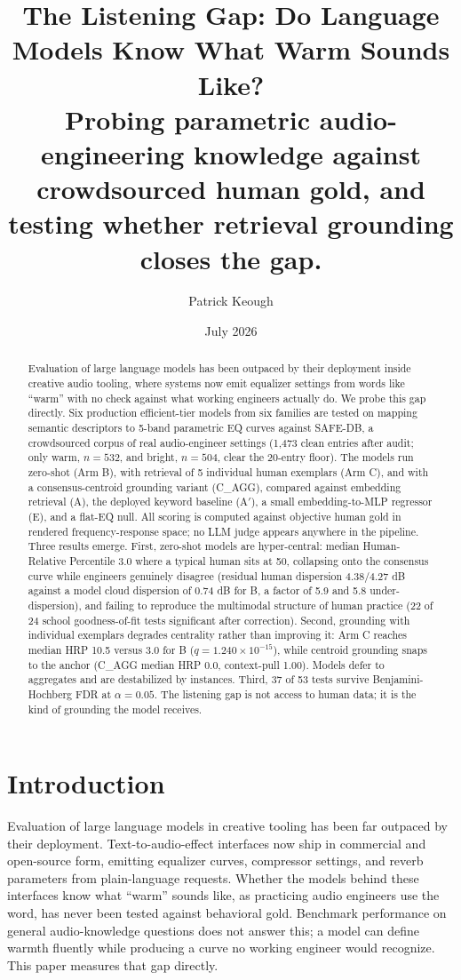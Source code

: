 \documentclass[11pt]{article}
\title{\textbf{The Listening Gap: Do Language Models Know What Warm Sounds Like?} \\[6pt] \large Probing parametric audio-engineering knowledge against crowdsourced human gold, and testing whether retrieval grounding closes the gap.}
\author[1]{Patrick Keough}
\affil[1]{Independent Researcher, \texttt{pskeough@gmail.com}}
\date{July 2026}
\begin{document}
\maketitle

\begin{abstract}
\noindent Evaluation of large language models has been outpaced by their deployment inside creative audio tooling, where systems now emit equalizer settings from words like ``warm'' with no check against what working engineers actually do. We probe this gap directly. Six production efficient-tier models from six families are tested on mapping semantic descriptors to 5-band parametric EQ curves against SAFE-DB, a crowdsourced corpus of real audio-engineer settings (1,473 clean entries after audit; only warm, $n=532$, and bright, $n=504$, clear the 20-entry floor). The models run zero-shot (Arm B), with retrieval of 5 individual human exemplars (Arm C), and with a consensus-centroid grounding variant (C\_AGG), compared against embedding retrieval (A), the deployed keyword baseline (A$'$), a small embedding-to-MLP regressor (E), and a flat-EQ null. All scoring is computed against objective human gold in rendered frequency-response space; no LLM judge appears anywhere in the pipeline. Three results emerge. First, zero-shot models are hyper-central: median Human-Relative Percentile 3.0 where a typical human sits at 50, collapsing onto the consensus curve while engineers genuinely disagree (residual human dispersion 4.38/4.27 dB against a model cloud dispersion of 0.74 dB for B, a factor of 5.9 and 5.8 under-dispersion), and failing to reproduce the multimodal structure of human practice (22 of 24 school goodness-of-fit tests significant after correction). Second, grounding with individual exemplars degrades centrality rather than improving it: Arm C reaches median HRP 10.5 versus 3.0 for B ($q=1.240\times10^{-15}$), while centroid grounding snaps to the anchor (C\_AGG median HRP 0.0, context-pull 1.00). Models defer to aggregates and are destabilized by instances. Third, 37 of 53 tests survive Benjamini-Hochberg FDR at $\alpha = 0.05$. The listening gap is not access to human data; it is the kind of grounding the model receives.
\end{abstract}

\section{Introduction}

Evaluation of large language models in creative tooling has been far outpaced by their deployment. Text-to-audio-effect interfaces now ship in commercial and open-source form, emitting equalizer curves, compressor settings, and reverb parameters from plain-language requests. Whether the models behind these interfaces know what ``warm'' sounds like, as practicing audio engineers use the word, has never been tested against behavioral gold. Benchmark performance on general audio-knowledge questions does not answer this; a model can define warmth fluently while producing a curve no working engineer would recognize. This paper measures that gap directly.
\end{document}
